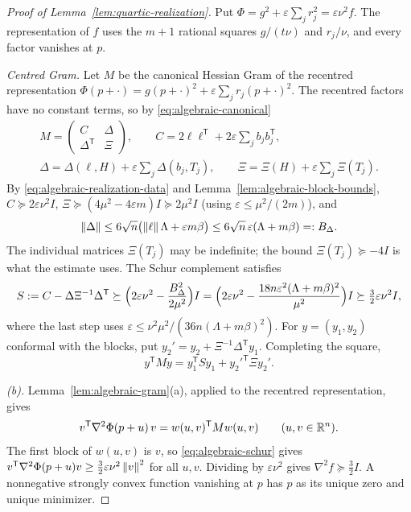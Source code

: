 \begin{proof}[Proof of Lemma~\ref{lem:quartic-realization}]
Put $\Phi=g^2+\varepsilon\sum_jr_j^2=\varepsilon\nu^2f$. The representation
of $f$ uses the $m+1$ rational squares $g/(t\nu)$ and $r_j/\nu$, and every
factor vanishes at $p$.

\emph{Centred Gram.} Let $M$ be the canonical Hessian Gram of the recentred
representation $\Phi(p+\cdot)=g(p+\cdot)^2+\varepsilon\sum_jr_j(p+\cdot)^2$.
The recentred factors have no constant terms, so by
\eqref{eq:algebraic-canonical}
\[
\begin{gathered}
 M=\begin{pmatrix}C&\Delta\\\Delta^{\mathsf T}&\Xi\end{pmatrix},\qquad
 C=2\ell\ell^{\mathsf T}+2\varepsilon\sum_jb_jb_j^{\mathsf T},\\
 \Delta=\Delta(\ell,H)+\varepsilon\sum_j\Delta(b_j,T_j),\qquad
 \Xi=\Xi(H)+\varepsilon\sum_j\Xi(T_j).
\end{gathered}
\]
By \eqref{eq:algebraic-realization-data} and
Lemma~\ref{lem:algebraic-block-bounds}, $C\succeq2\varepsilon\nu^2I$,
$\Xi\succeq(4\mu^2-4\varepsilon m)I\succeq2\mu^2I$ (using
$\varepsilon\le\mu^2/(2m)$), and
\[
 \left\lVert\Delta\right\rVert\le6\sqrt n\bigl(\left\lVert\ell\right\rVert\Lambda+\varepsilon m\beta\bigr)
 \le6\sqrt n\,\varepsilon(\Lambda+m\beta)=:B_\Delta .
\]
The individual matrices $\Xi(T_j)$ may be indefinite; the bound
$\Xi(T_j)\succeq-4I$ is what the estimate uses. The Schur complement satisfies
\[
 S:=C-\Delta\Xi^{-1}\Delta^{\mathsf T}
 \succeq\Bigl(2\varepsilon\nu^2-\frac{B_\Delta^2}{2\mu^2}\Bigr)I
 =\Bigl(2\varepsilon\nu^2-\frac{18n\varepsilon^2(\Lambda+m\beta)^2}{\mu^2}\Bigr)I
 \succeq\tfrac32\varepsilon\nu^2I,
\]
where the last step uses $\varepsilon\le\nu^2\mu^2/(36n(\Lambda+m\beta)^2)$.
For $y=(y_1,y_2)$ conformal with the blocks, put
$y_2'=y_2+\Xi^{-1}\Delta^{\mathsf T}y_1$. Completing the square,
\begin{equation}
 y^{\mathsf T}My=y_1^{\mathsf T}Sy_1+y_2'^{\mathsf T}\Xi y_2'.
 \label{eq:algebraic-schur}
\end{equation}

\emph{(b).} Lemma~\ref{lem:algebraic-gram}(a), applied to the recentred
representation, gives
\[
 v^{\mathsf T}\nabla^2\Phi(p+u)\,v=w(u,v)^{\mathsf T}Mw(u,v)
 \qquad(u,v\in\mathbb R^n).
\]
The first block of $w(u,v)$ is $v$, so \eqref{eq:algebraic-schur} gives
$v^{\mathsf T}\nabla^2\Phi(p+u)v\ge\tfrac32\varepsilon\nu^2\left\lVert v\right\rVert^2$ for all
$u,v$. Dividing by $\varepsilon\nu^2$ gives $\nabla^2f\succeq\frac32I$. A
nonnegative strongly convex function vanishing at $p$ has $p$ as its unique
zero and unique minimizer.


\end{proof}
